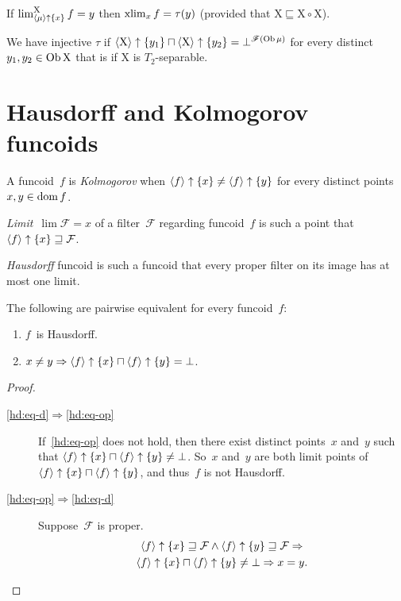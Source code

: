 \begin{cor}
If $\lim_{\left\langle \mu\right\rangle\uparrow\{x\}}^{\mathrm{X}}f=y$ then $\operatorname{xlim}_{x}f=\tau(y)$ (provided that $\mathrm{X}\sqsubseteq\mathrm{X}\circ\mathrm{X}$).
\end{cor}
We have injective $\tau$ if $\left\langle \mathrm{X}\right\rangle\uparrow\{y_{1}\}\sqcap\left\langle \mathrm{X}\right\rangle\uparrow\{y_{2}\}=\bot^{\mathscr{F}(\operatorname{Ob}\mu)}$
for every distinct $y_{1},y_{2}\in\operatorname{Ob}\mathrm{X}$ that is if $\mathrm{X}$ is $T_{2}$-separable.

\section{Hausdorff and Kolmogorov funcoids}

\begin{defn}
A funcoid~$f$ is \emph{Kolmogorov} when
$\left\langle f\right\rangle\uparrow\{x\}\ne\left\langle f\right\rangle\uparrow\{y\}$ for every distinct points
$x,y\in\operatorname{dom} f$.
\end{defn}

\begin{defn}
\emph{Limit}~$\lim\mathcal{F}=x$ of a filter~$\mathcal{F}$
regarding funcoid~$f$ is such a point that $\left\langle f\right\rangle\uparrow\{x\}\sqsupseteq\mathcal{F}$.
\end{defn}

\begin{defn}
\emph{Hausdorff} funcoid is such a funcoid that every proper
filter on its image has at most one limit.
\end{defn}

\begin{prop}
The following are pairwise equivalent for every funcoid~$f$:
\begin{enumerate}
\item\label{hd:eq-d} $f$~is Hausdorff.
\item\label{hd:eq-op}
$x\ne y\Rightarrow\left\langle f\right\rangle\uparrow\{x\}\sqcap\left\langle f\right\rangle\uparrow\{y\}=\bot$.
\end{enumerate}
\end{prop}

\begin{proof}
~
\begin{description}
\item[\ref{hd:eq-d}$\Rightarrow$\ref{hd:eq-op}]
If~\ref{hd:eq-op} does not hold,
then there exist distinct points~$x$ and~$y$ such that
$\left\langle f\right\rangle\uparrow\{x\}\sqcap\left\langle f\right\rangle\uparrow\{y\}\ne\bot$.
So~$x$ and~$y$ are both limit points of
$\left\langle f\right\rangle\uparrow\{x\}\sqcap\left\langle f\right\rangle\uparrow\{y\}$, and thus~$f$ is not
Hausdorff.
\item[\ref{hd:eq-op}$\Rightarrow$\ref{hd:eq-d}]
Suppose~$\mathcal{F}$ is proper.
\begin{multline*}
\left\langle f\right\rangle\uparrow\{x\}\sqsupseteq\mathcal{F}\land
\left\langle f\right\rangle\uparrow\{y\}\sqsupseteq\mathcal{F}\Rightarrow \\
\left\langle f\right\rangle\uparrow\{x\}\sqcap\left\langle f\right\rangle\uparrow\{y\}\ne\bot \Rightarrow x=y.
\end{multline*}
\end{description}
\end{proof}

